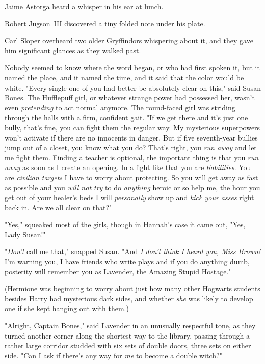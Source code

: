 Jaime Astorga heard a whisper in his ear at lunch.

Robert Jugson~III discovered a tiny folded note under his plate.

Carl Sloper overheard two older Gryffindors whispering about it, and they gave
him significant glances as they walked past.

Nobody seemed to know where the word began, or who had first spoken it, but it
named the place, and it named the time, and it said that the color would be
white.
\sbreak
"Every single one of you had better be absolutely clear on this," said Susan
Bones. The Hufflepuff girl, or whatever strange power had possessed her, wasn't
even \emph{pretending} to act normal anymore. The round-faced girl was striding
through the halls with a firm, confident gait. "If we get there and it's just
one bully, that's fine, you can fight them the regular way. My mysterious
superpowers won't activate if there are no innocents in danger. But if five
seventh-year bullies jump out of a closet, you know what you do? That's right,
you \emph{run away} and let me fight them. Finding a teacher is optional, the
important thing is that you \emph{run away} as soon as I create an opening. In
a fight like that you are \emph{liabilities}. You are \emph{civilian targets} I
have to worry about protecting. So you will get away as fast as possible and
you \emph{will not try} to do \emph{anything} heroic or so help me, the hour
you get out of your healer's beds I will \emph{personally} show up and
\emph{kick your asses} right back in. Are we all clear on that?"

"Yes," squeaked most of the girls, though in Hannah's case it came out, "Yes,
Lady Susan!"

"\emph{Don't} call me that," snapped Susan. "And \emph{I don't think I heard
you, Miss Brown!} I'm warning you, I have friends who write plays and if you do
anything dumb, posterity will remember you as Lavender, the Amazing Stupid
Hostage."

(Hermione was beginning to worry about just how many other Hogwarts students
besides Harry had mysterious dark sides, and whether \emph{she} was likely to
develop one if she kept hanging out with them.)

"Alright, Captain Bones," said Lavender in an unusually respectful tone, as
they turned another corner along the shortest way to the library, passing
through a rather large corridor studded with six sets of double doors, three
sets on either side. "Can I ask if there's any way for \emph{me} to become a
double witch?"

